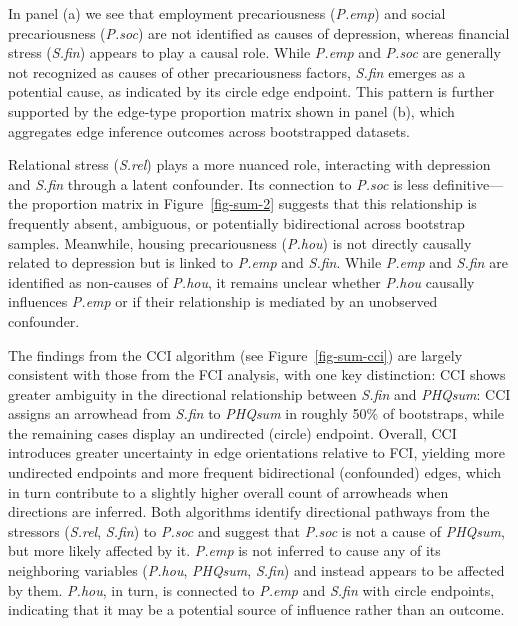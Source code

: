 \documentclass[
]{article}
\begin{document}
In panel (a) we see that employment precariousness (\emph{P.emp}) and
social precariousness (\emph{P.soc}) are not identified as causes of
depression, whereas financial stress (\emph{S.fin}) appears to play a
causal role. While \emph{P.emp} and \emph{P.soc} are generally not
recognized as causes of other precariousness factors, \emph{S.fin}
emerges as a potential cause, as indicated by its circle edge endpoint.
This pattern is further supported by the edge-type proportion matrix
shown in panel (b), which aggregates edge inference outcomes across
bootstrapped datasets.

Relational stress (\emph{S.rel}) plays a more nuanced role, interacting
with depression and \emph{S.fin} through a latent confounder. Its
connection to \emph{P.soc} is less definitive---the proportion matrix in
Figure~\ref{fig-sum-2} suggests that this relationship is frequently
absent, ambiguous, or potentially bidirectional across bootstrap
samples. Meanwhile, housing precariousness (\emph{P.hou}) is not
directly causally related to depression but is linked to \emph{P.emp}
and \emph{S.fin}. While \emph{P.emp} and \emph{S.fin} are identified as
non-causes of \emph{P.hou}, it remains unclear whether \emph{P.hou}
causally influences \emph{P.emp} or if their relationship is mediated by
an unobserved confounder.

The findings from the CCI algorithm (see Figure~\ref{fig-sum-cci}) are
largely consistent with those from the FCI analysis, with one key
distinction: CCI shows greater ambiguity in the directional relationship
between \emph{S.fin} and \emph{PHQsum}: CCI assigns an arrowhead from
\emph{S.fin} to \emph{PHQsum} in roughly 50\% of bootstraps, while the
remaining cases display an undirected (circle) endpoint. Overall, CCI
introduces greater uncertainty in edge orientations relative to FCI,
yielding more undirected endpoints and more frequent bidirectional
(confounded) edges, which in turn contribute to a slightly higher
overall count of arrowheads when directions are inferred. Both
algorithms identify directional pathways from the stressors
(\emph{S.rel}, \emph{S.fin}) to \emph{P.soc} and suggest that
\emph{P.soc} is not a cause of \emph{PHQsum}, but more likely affected
by it. \emph{P.emp} is not inferred to cause any of its neighboring
variables (\emph{P.hou}, \emph{PHQsum}, \emph{S.fin}) and instead
appears to be affected by them. \emph{P.hou}, in turn, is connected to
\emph{P.emp} and \emph{S.fin} with circle endpoints, indicating that it
may be a potential source of influence rather than an outcome.
\end{document}
